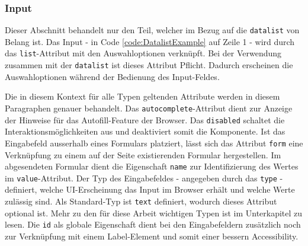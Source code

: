 \subsubsection{\color{dgray} Input}
\label{sec:input}

Dieser Abschnitt behandelt nur den Teil, welcher im Bezug auf die \texttt{datalist} von Belang ist.
Das Input - in Code \ref{code:DatalistExample} auf Zeile 1 - wird durch das \texttt{list}-Attribut mit den Auswahloptionen verknüpft.
Bei der Verwendung zusammen mit der \texttt{datalist} ist dieses Attribut Pflicht.
Dadurch erscheinen die Auswahloptionen während der Bedienung des Input-Feldes. 

Die in diesem Kontext für alle Typen geltenden Attribute werden in diesem Paragraphen genauer behandelt.
Das \texttt{autocomplete}-Attribut dient zur Anzeige der Hinweise für das Autofill-Feature der Browser.
Das \texttt{disabled} schaltet die Interaktionsmöglichkeiten aus und deaktiviert somit die Komponente.
Ist das Eingabefeld ausserhalb eines Formulars platziert, lässt sich das Attribut \texttt{form} eine Verknüpfung zu einem auf der Seite existierenden Formular hergestellen. 
Im abgesendeten Formular dient die Eigenschaft \texttt{name} zur Identifizierung des Wertes im \texttt{value}-Attribut.
Der Typ des Eingabefeldes - angegeben durch das \texttt{type} - definiert, welche UI-Erscheinung das Input im Browser erhält und welche Werte zulässig sind.
Als Standard-Typ ist \texttt{text} definiert, wodurch dieses Attribut optional ist.
Mehr zu den für diese Arbeit wichtigen Typen ist im Unterkapitel \textbf{} zu lesen.
Die \texttt{id} als globale Eigenschaft dient bei den Eingabefeldern zusätzlich noch zur Verknüpfung mit einem Label-Element und somit einer bessern Accessibility.

